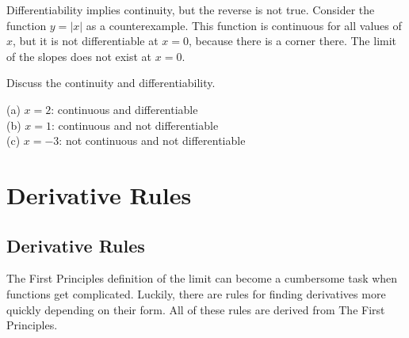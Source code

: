 Differentiability implies continuity, but the reverse is not true. Consider the function $ y = |x| $ as a counterexample. This function is continuous for all values of $ x $, but it is not differentiable at $ x = 0 $, because there is a corner there. The limit of the slopes does not exist at $ x = 0$. \\

\begin{exercise}\nonumber
    Discuss the continuity and differentiability. \\

    \begin{figure}[H]
        \centering
    \end{figure}

    (a) $ x = 2 $: continuous and differentiable \\

    (b) $ x = 1 $: continuous and not differentiable \\

    (c) $ x = -3 $: not continuous and not differentiable
\end{exercise}

\chapter{Derivative Rules}

\section{Derivative Rules}

The First Principles definition of the limit can become a cumbersome task when functions get complicated. Luckily, there are rules for finding derivatives more quickly depending on their form. All of these rules are derived from The First Principles. \\

